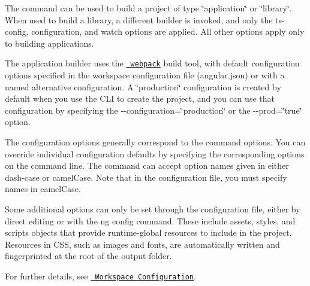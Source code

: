 The command can be used to build a project of type \char`\"{}application\char`\"{} or \char`\"{}library\char`\"{}. When used to build a library, a different builder is invoked, and only the {\ttfamily ts-\/config}, {\ttfamily configuration}, and {\ttfamily watch} options are applied. All other options apply only to building applications.

The application builder uses the \href{https://webpack.js.org/}{\texttt{ webpack}} build tool, with default configuration options specified in the workspace configuration file ({\ttfamily angular.\+json}) or with a named alternative configuration. A \char`\"{}production\char`\"{} configuration is created by default when you use the CLI to create the project, and you can use that configuration by specifying the {\ttfamily -\/-\/configuration=\char`\"{}production\char`\"{}} or the {\ttfamily -\/-\/prod=\char`\"{}true\char`\"{}} option.

The configuration options generally correspond to the command options. You can override individual configuration defaults by specifying the corresponding options on the command line. The command can accept option names given in either dash-\/case or camel\+Case. Note that in the configuration file, you must specify names in camel\+Case.

Some additional options can only be set through the configuration file, either by direct editing or with the {\ttfamily ng config} command. These include {\ttfamily assets}, {\ttfamily styles}, and {\ttfamily scripts} objects that provide runtime-\/global resources to include in the project. Resources in CSS, such as images and fonts, are automatically written and fingerprinted at the root of the output folder.

For further details, see \href{guide/workspace-config}{\texttt{ Workspace Configuration}}. 